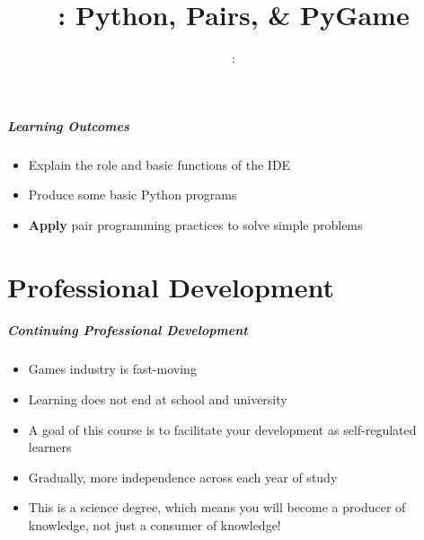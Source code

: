\usepackage{../../beamerthemeFalmouthGamesAcademy}
\usepackage{multimedia}
\graphicspath{ {../../} }

\usepackage{textcomp}


\usepackage[normalem]{ulem}
\usepackage{wasysym}

\usepackage{pdfpages}

\usetikzlibrary{arrows,automata}







\title{\sessionnumber: Python, Pairs, \& PyGame}
\subtitle{\modulecode: \moduletitle}

\frame{\titlepage} 

\begin{frame}
	\frametitle{Learning Outcomes}
	\begin{itemize}
		\item Explain the role and basic functions of the IDE
		\item Produce some basic Python programs
		\item \textbf{Apply} pair programming practices to solve simple problems
	\end{itemize}
\end{frame}

\part{Professional Development}
\frame{\partpage}

\begin{frame}
	\frametitle{Continuing Professional Development}
	
	\begin{itemize}
		\item Games industry is fast-moving
		\item Learning does not end at school and university
		\item A goal of this course is to facilitate your development as self-regulated learners
		\item Gradually, more independence across each year of study
		\item This is a science degree, which means you will become a producer of knowledge, not just a consumer of knowledge!
	\end{itemize}
\end{frame}

